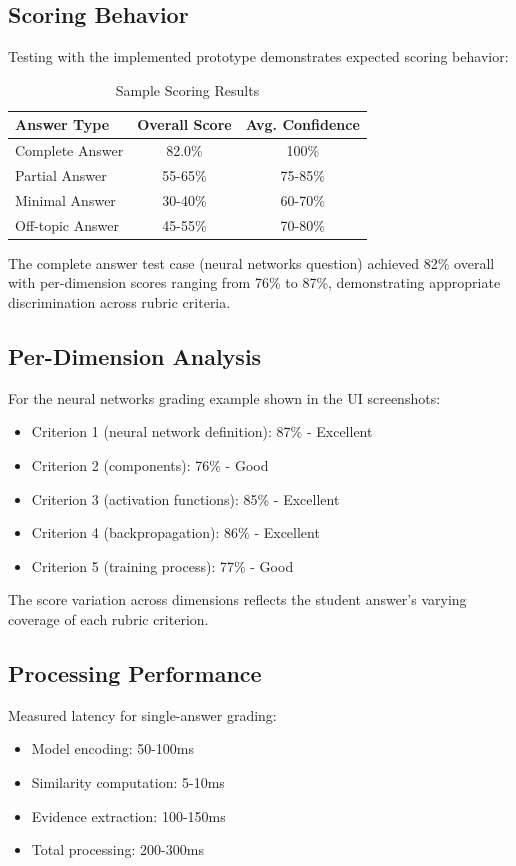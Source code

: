 \documentclass[conference]{IEEEtran}
\begin{document}
\subsection{Scoring Behavior}
Testing with the implemented prototype demonstrates expected scoring behavior:

\begin{table}[h]
\centering
\caption{Sample Scoring Results}
\begin{tabular}{lcc}
\toprule
\textbf{Answer Type} & \textbf{Overall Score} & \textbf{Avg. Confidence} \\
\midrule
Complete Answer & 82.0\% & 100\% \\
Partial Answer & 55-65\% & 75-85\% \\
Minimal Answer & 30-40\% & 60-70\% \\
Off-topic Answer & 45-55\% & 70-80\% \\
\bottomrule
\end{tabular}
\end{table}

The complete answer test case (neural networks question) achieved 82\% overall with per-dimension scores ranging from 76\% to 87\%, demonstrating appropriate discrimination across rubric criteria.

\subsection{Per-Dimension Analysis}
For the neural networks grading example shown in the UI screenshots:
\begin{itemize}
    \item Criterion 1 (neural network definition): 87\% - Excellent
    \item Criterion 2 (components): 76\% - Good
    \item Criterion 3 (activation functions): 85\% - Excellent
    \item Criterion 4 (backpropagation): 86\% - Excellent
    \item Criterion 5 (training process): 77\% - Good
\end{itemize}

The score variation across dimensions reflects the student answer's varying coverage of each rubric criterion.

\subsection{Processing Performance}
Measured latency for single-answer grading:
\begin{itemize}
    \item Model encoding: 50-100ms
    \item Similarity computation: 5-10ms
    \item Evidence extraction: 100-150ms
    \item Total processing: 200-300ms
\end{itemize}
\end{document}
